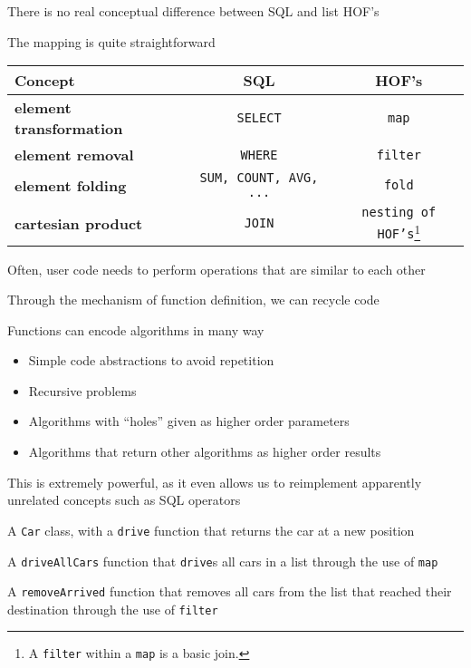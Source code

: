 \documentclass{beamer}
\begin{document}
\begin{slide}{
\item There is no real conceptual difference between SQL and list HOF's
\item The mapping is quite straightforward
}\end{slide}

\begin{textslide}
{
\tiny
\begin{tabular}{| p{3cm} | c | c |}
\hline
\textbf{Concept} & \textbf{SQL} & \textbf{HOF's} \\
\hline
\textbf{element transformation} & \texttt{SELECT} & \texttt{map} \\
\hline
\textbf{element removal} & \texttt{WHERE} & \texttt{filter} \\
\hline
\textbf{element folding} & \texttt{SUM, COUNT, AVG, ...} & \texttt{fold} \\
\hline
\textbf{cartesian product} & \texttt{JOIN} & \texttt{nesting of HOF's}\footnote{A \texttt{filter} within a \texttt{map} is a basic join.} \\
\hline
\end{tabular}
}
\end{textslide}

\begin{slide}{
\item Often, user code needs to perform operations that are similar to each other
\item Through the mechanism of function definition, we can recycle code
\item Functions can encode algorithms in many way
\begin{itemize}
\item Simple code abstractions to avoid repetition
\item Recursive problems
\item Algorithms with ``holes'' given as higher order parameters
\item Algorithms that return other algorithms as higher order results
\end{itemize}
\item This is extremely powerful, as it even allows us to reimplement apparently unrelated concepts such as SQL operators
}\end{slide}

\begin{slide}{
\item A \texttt{Car} class, with a \texttt{drive} function that returns the car at a new position
\item A \texttt{driveAllCars} function that \texttt{drive}s all cars in a list through the use of \texttt{map}
\item A \texttt{removeArrived} function that removes all cars from the list that reached their destination through the use of \texttt{filter}
}\end{slide}

\begin{thankyou}
\end{thankyou}
\end{document}

